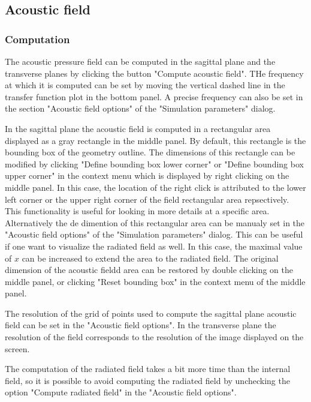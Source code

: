 \documentclass[]{article}
\begin{document}
	\subsection{Acoustic field}
	
	\subsubsection{Computation}
	
	The acoustic pressure field can be computed in the sagittal plane and the 
	transverse planes by clicking the button "Compute acoustic field".
	THe frequency at which it is computed can be set by moving the vertical dashed line 
	in the transfer function plot in the bottom panel. 
	A precise frequency can also be set in the section "Acoustic field options" of the 
	"Simulation parameters" dialog.
	
	In the sagittal plane the acoustic field is computed in a rectangular area displayed
	as a gray rectangle in the middle panel. 
	By default, this rectangle is the bounding box of the geometry outline.
	The dimensions of this rectangle can be modified by clicking 
	"Define bounding box lower corner" or "Define bounding box upper corner" in the 
	context menu which is displayed by right clicking on the middle panel.
	In this case, the location of the right click is attributed to the lower left corner
	or the upper right corner of the field rectangular area repsectively.
	This functionality is useful for looking in more details at a specific area.
	Alternatively the de dimention of this rectangular area can be manualy set in the
	"Acoustic field options" of the "Simulation parameters" dialog.
	This can be useful if one want to visualize the radiated field as well.
	In this case, the maximal value of $x$ can be increased to extend the area to the 
	radiated field.
	The original dimension of the acoustic fieldd area can be restored by double 
	clicking on the middle panel, or clicking "Reset bounding box" in the context
	menu of the middle panel.
	
	The resolution of the grid of points used to compute the sagittal plane 
	acoustic field can be set in the "Acoustic field options". 
	In the transverse plane the resolution of the field corresponds to the resolution 
	of the image displayed on the screen.
	
	The computation of the radiated field takes a bit more time than the internal field,
	so it is possible to avoid computing the radiated field by unchecking the 
	option "Compute radiated field" in the "Acoustic field options".
	
\end{document}
